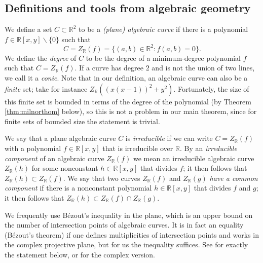 \documentclass[12pt]{article}
\newcommand{\RR}{\mathbb R}
\newcommand{\CC}{\mathbb C}
\begin{document}
\subsection{Definitions and tools from algebraic geometry}\label{subsec:alggeom}
We define a set $C\subset \RR^2$ to be a {\it (plane) algebraic curve} if there is a polynomial $f\in \RR[x,y]\backslash\{0\}$ such that 
$$C = Z_{\RR}(f) = \{ (a,b)\in\RR^2: f(a,b) = 0\}.$$
We define the {\it degree} of $C$ to be the degree of a minimum-degree polynomial $f$ such that $C=Z_{\RR}(f)$. 
If a curve has degree $2$ and is not the union of two lines, we call it a {\it conic}.
Note that in our definition, an algebraic curve can also be a {\it finite} set; take for instance $Z_{\RR}((x(x-1))^2 + y^2)$.
Fortunately, the size of this finite set is bounded in terms of the degree of the polynomial (by Theorem \ref{thm:milnorthom} below), so this is not a problem in our main theorem, since for finite sets of bounded size the statement is trivial.

We say that a plane algebraic curve $C$ is {\it irreducible} if we can write $C=Z_{\RR}(f)$ with a polynomial $f\in \RR[x,y]$ that is irreducible over $\RR$.
By an {\it irreducible component} of an algebraic curve $Z_{\RR}(f)$ we mean an irreducible algebraic curve $Z_{\RR}(h)$ for some nonconstant $h\in \RR[x,y]$ that divides $f$;
it then follows that $Z_{\RR}(h)\subset Z_{\RR}(f)$.
We say that two curves $Z_{\RR}(f)$ and $Z_{\RR}(g)$ {\it have a common component} if there is a nonconstant polynomial $h\in \RR[x,y]$ that divides $f$ and $g$; it then follows that $Z_{\RR}(h)\subset Z_{\RR}(f)\cap Z_{\RR}(g)$.


We frequently use B\'ezout's inequality in the plane, which is an upper bound on the number of intersection points of algebraic curves.
It is in fact an equality (B\'ezout's theorem) if one defines multiplicities of intersection points and works in the complex projective plane, but for us the inequality suffices.
See \cite[Lemma 14.4]{gibson:elementary} for exactly the statement below, 
or \cite[Theorem 8.7.10]{cox:ideals} for the complex version.
\end{document}
